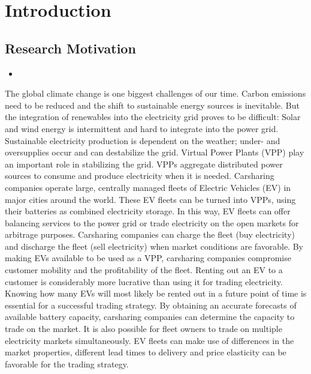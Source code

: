 \documentclass[a4paper, 12pt]{article}
\let\cite\shortcite
\begin{document}
\section{Introduction}
\label{sec:orgb5e5fb2}
\subsection{Research Motivation}
\label{sec:orgdd0461c}
\begin{itemize}
\item \cite{lopes11_integ_elect_vehic_elect_power_system}
\end{itemize}

The global climate change is one biggest challenges of our time. Carbon
emissions need to be reduced and the shift to sustainable energy sources is
inevitable. But the integration of renewables into the electricity grid proves
to be difficult: Solar and wind energy is intermittent and hard to integrate
into the power grid. Sustainable electricity production is dependent on the
weather; under- and oversupplies occur and can destabilize the grid. Virtual
Power Plants (VPP) play an important role in stabilizing the grid. VPPs
aggregate distributed power sources to consume and produce electricity when it
is needed. Carsharing companies operate large, centrally managed fleets of
Electric Vehicles (EV) in major cities around the world. These EV fleets can be
turned into VPPs, using their batteries as combined electricity storage. In this
way, EV fleets can offer balancing services to the power grid or trade
electricity on the open markets for arbitrage purposes. Carsharing companies can
charge the fleet (buy electricity) and discharge the fleet (sell electricity)
when market conditions are favorable. By making EVs available to be used as a
VPP, carsharing companies compromise customer mobility and the profitability of
the fleet. Renting out an EV to a customer is considerably more lucrative than
using it for trading electricity. Knowing how many EVs will most likely be
rented out in a future point of time is essential for a successful trading
strategy. By obtaining an accurate forecasts of available battery capacity,
carsharing companies can determine the capacity to trade on the market. It is
also possible for fleet owners to trade on multiple electricity markets
simultaneously. EV fleets can make use of differences in the market properties,
different lead times to delivery and price elasticity can be favorable for the
trading strategy.
\end{document}
